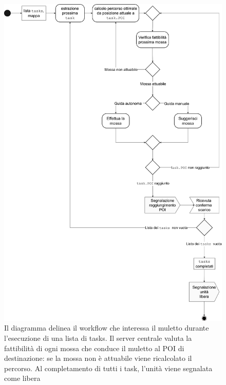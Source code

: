 \begin{figure}[H]
	\centering
	\includegraphics[scale=0.37]{res/images/diagramma_di_attivita2.png}
	\caption[Diagramma di attività per l'evasione di una lista di tasks da parte di un muletto]{Il diagramma delinea il workflow che interessa il muletto durante l'esecuzione di una lista di tasks. Il server centrale valuta la fattibilità di ogni mossa che conduce il muletto al POI di destinazione: se la mossa non è attuabile viene ricalcolato il percorso. Al completamento di tutti i task, l'unità viene segnalata come libera}
\end{figure}





